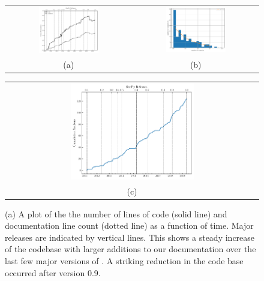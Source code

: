 \begin{figure}
\begin{tabular}{cc}
  \includegraphics[width=0.5\textwidth]{figures/fig_loc_vs_time.pdf} &
  \includegraphics[width=0.5\textwidth]{figures/busfactor_plot.pdf} \\
(a) & (b) \\
\end{tabular}
\begin{tabular}{c}
  \includegraphics[width=0.5\textwidth]{figures/cumulative_authors.pdf} \\
(c) \\
\end{tabular}
\caption{
	(a) A plot of the the number of lines of code (solid line) and documentation line count (dotted line) as a function of time.
	Major releases are indicated by vertical lines.
	This shows a steady increase of the \sunpypkg codebase with larger additions to our documentation over the last few major versions of \sunpypkg.
	A striking reduction in the code base occurred after version 0.9.
}
\end{figure}
